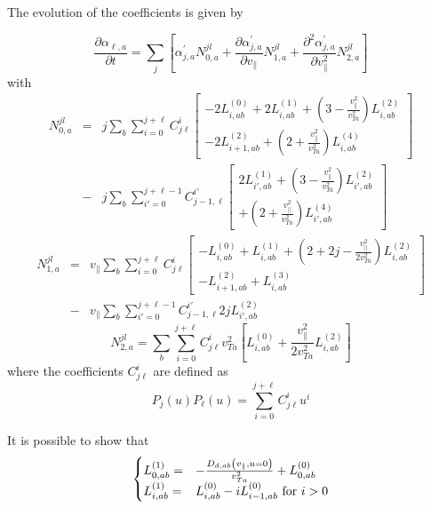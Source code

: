 \documentclass[11pt,preprint]{elsarticle}
\begin{document}
The evolution of the coefficients is given by

\begin{equation}
\frac{\partial\alpha_{\ell,a}}{\partial t}=\sum_{j}\left[\alpha_{j,a}^{'}N_{0,a}^{jl}+\frac{\partial\alpha_{j,a}^{'}}{\partial v_{\parallel}}N_{1,a}^{jl}+\frac{\partial^{2}\alpha_{j,a}^{'}}{\partial v_{\parallel}^{2}}N_{2,a}^{jl}\right]\label{eq:projection detaillee}
\end{equation}
with
\begin{eqnarray*}
N_{0,a}^{jl} & = & j\sum_{b}\sum_{i=0}^{j+\ell}C_{j\ell}^{i}\left[\begin{array}{c}
-2L_{i,ab}^{(0)}+2L_{i,ab}^{(1)}+\left(3-\frac{v_{\parallel}^{2}}{v_{Ta}^{2}}\right)L_{i,ab}^{(2)}\\
-2L_{i+1,ab}^{(2)}+\left(2+\frac{v_{\parallel}^{2}}{v_{Ta}^{2}}\right)L_{i,ab}^{(4)}
\end{array}\right]\\
 & - & j\sum_{b}\sum_{i'=0}^{j+\ell-1}C_{j-1,\ell}^{i'}\left[\begin{array}{c}
2L_{i',ab}^{(1)}+\left(3-\frac{v_{\parallel}^{2}}{v_{Ta}^{2}}\right)L_{i',ab}^{(2)}\\
+\left(2+\frac{v_{\parallel}^{2}}{v_{Ta}^{2}}\right)L_{i',ab}^{(4)}
\end{array}\right]
\end{eqnarray*}
\begin{eqnarray*}
N_{1,a}^{jl} & = & v_{\parallel}\sum_{b}\sum_{i=0}^{j+\ell}C_{j\ell}^{i}\left[\begin{array}{c}
-L_{i,ab}^{(0)}+L_{i,ab}^{(1)}+\left(2+2j-\frac{v_{\parallel}^{2}}{2v_{Ta}^{2}}\right)L_{i,ab}^{(2)}\\
-L_{i+1,ab}^{(2)}+L_{i,ab}^{(3)}
\end{array}\right]\\
 & - & v_{\parallel}\sum_{b}\sum_{i'=0}^{j+\ell-1}C_{j-1,\ell}^{i'}2jL_{i',ab}^{(2)}
\end{eqnarray*}
\[
N_{2,a}^{jl}=\sum_{b}\sum_{i=0}^{j+\ell}C_{j\ell}^{i}v_{Ta}^{2}\left[L_{i,ab}^{(0)}+\frac{v_{\parallel}^{2}}{2v_{Ta}^{2}}L_{i,ab}^{(2)}\right]
\]
where the coefficients $C_{j\ell}^{i}$ are defined as
\[
P_{j}\left(u\right) P_{\ell}\left(u\right) = \sum_{i=0}^{j+\ell}C_{j\ell}^{i} u^{i}
\]

It is possible to show that
\[
\begin{cases}
L_{0,ab}^{(1)}= & -\frac{D_{d,ab}\left(v_{\parallel},u=0\right)}{v_{Ta}^{2}}+L_{0,ab}^{(0)}\\
L_{i,ab}^{(1)}= & L_{i,ab}^{(0)}-iL_{i-1,ab}^{(0)}\text{ for \ensuremath{i>0}}
\end{cases}
\]
\end{document}
